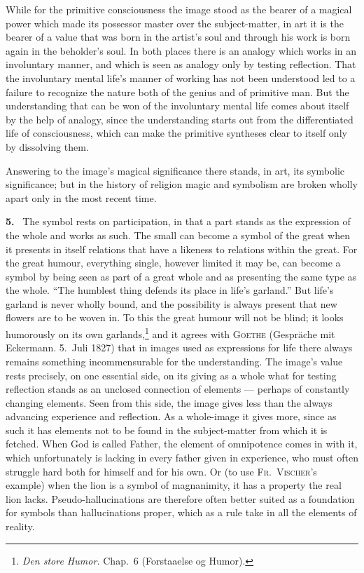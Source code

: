 \documentclass[12pt]{book}
\newcommand{\hnum}[1]{\noindent\textbf{#1.}~}
\newcommand{\opage}[1]{\marginnote{\footnotesize\textit{[#1]}}}
\begin{document}
While for the primitive consciousness the image stood as the bearer of a magical
power which made its possessor master over the subject-matter, in art it is the
bearer of a value that was born in the artist's soul and through his work is
born again in the beholder's soul. In both places there is an analogy which
works in an involuntary manner, and which is seen as analogy only by testing
reflection. That the involuntary mental life's manner of working has not been
understood led to a failure to recognize the nature both of the genius and of
primitive man. But the understanding that can be won of the involuntary mental
life comes about itself by the help of analogy, since the understanding starts
out from the differentiated life of consciousness, which can make the primitive
syntheses clear to itself only by dissolving them.

Answering to the image's magical significance there stands, in \opage{32}art, its symbolic
significance; but in the history of religion magic and symbolism are broken
wholly apart only in the most recent time.

\hnum{5} The symbol rests on participation, in that a part stands as the
expression of the whole and works as such. The small can become a symbol of the
great when it presents in itself relations that have a likeness to relations
within the great. For the great humour, everything single, however limited it
may be, can become a symbol by being seen as part of a great whole and as
presenting the same type as the whole. ``The humblest thing defends its place in
life's garland.'' But life's garland is never wholly bound, and the possibility
is always present that new flowers are to be woven in. To this the great humour
will not be blind; it looks humorously on its own garlands,\footnote{\textit{Den
store Humor.} Chap.\ 6 (Forstaaelse og Humor).} and it agrees with
\textsc{Goethe} (Gespräche mit Eckermann. 5.\ Juli 1827) that in images used as
expressions for life there always remains something incommensurable for the
understanding. The image's value rests precisely, on one essential side, on its
giving as a whole what for testing reflection stands as an unclosed connection
of elements --- perhaps of constantly changing elements. Seen from this side,
the image gives less than the always advancing experience and reflection. As a
whole-image it gives more, since as such it has elements not to be found in the
subject-matter from which it is fetched. When God is called Father, the element
of omnipotence comes in with it, which unfortunately is lacking in every father
given in experience, who must often struggle hard both for himself and for his
own. Or (to use \textsc{Fr.\ Vischer}'s example) when the lion is a symbol of
magnanimity, it has a property the real lion lacks. Pseudo-hallucinations are
therefore often better suited as a foundation for symbols than \opage{33}hallucinations
proper, which as a rule take in all the elements of reality.
\end{document}
